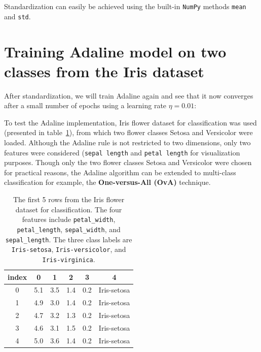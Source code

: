 \documentclass[11pt]{article}
\begin{document}
    Standardization can easily be achieved using the built-in \texttt{NumPy} methods \texttt{mean} and \texttt{std}.

    \section{Training Adaline model on two classes from the Iris dataset} \label{sec:ada_iris}

    After standardization, we will train Adaline again and see that it now converges after a small number of epochs using a learning rate $\eta=0.01$:

    To test the Adaline implementation, Iris flower dataset for classification was used (presented in table~\ref{tab:iris}), from which two flower classes Setosa and Versicolor were loaded.
    Although the Adaline rule is not restricted to two dimensions, only two features were considered (\texttt{sepal length} and \texttt{petal length} for visualization purposes.
    Though only the two flower classes Setosa and Versicolor were chosen for practical reasons, the Adaline algorithm can be extended to multi-class classification \textemdash for example, the \textbf{One-versus-All (OvA)} technique.

    \begin{table}[h!]
        \centering
        \begin{tabular}{||c | c c c c | c||}
            \hline
            index & 0 & 1 & 2 & 3 & 4 \\
            \hline
            \hline
            0 & 5.1 & 3.5 & 1.4 & 0.2 & Iris-setosa \\
            \hline
            1 & 4.9 & 3.0 & 1.4 & 0.2 & Iris-setosa \\
            \hline
            2 & 4.7 & 3.2 & 1.3 & 0.2 & Iris-setosa \\
            \hline
            3 & 4.6 & 3.1 & 1.5 & 0.2 & Iris-setosa \\
            \hline
            4 & 5.0 & 3.6 & 1.4 & 0.2 & Iris-setosa \\
            \hline
        \end{tabular}
        \caption{The first 5 rows from the Iris flower dataset for classification.
        The four features include \texttt{petal\_width}, \texttt{petal\_length}, \texttt{sepal\_width}, and \texttt{sepal\_length}.
        The three class labels are \texttt{Iris-setosa}, \texttt{Iris-versicolor}, and \texttt{Iris-virginica}.}
        \label{tab:iris}

    \end{table}
\end{document}
